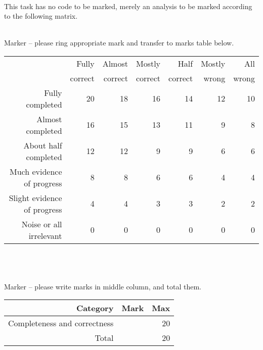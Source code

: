 \parbox{\textwidth}{
 \\

This task has no code to be marked, merely an analysis to be marked according
to the following matrix.

 \\
Marker -- please ring appropriate mark and transfer to marks table below. \\

\begin{tabular}{||r||r|r|r|r|r|r||} \hline \hline
                            & Fully   & Almost  & Mostly  & Half    & Mostly & All   \\
                            & correct & correct & correct & correct & wrong  & wrong \\ \hline
\hline
Fully completed             &      20 &        18 &    16 &      14 &     12 &    10 \\ \hline
Almost completed            &      16 &        15 &    13 &      11 &      9 &     8 \\ \hline
About half completed        &      12 &        12 &     9 &       9 &      6 &     6 \\ \hline
Much evidence of progress   &       8 &         8 &     6 &       6 &      4 &     4 \\ \hline
Slight evidence of progress &       4 &         4 &     3 &       3 &      2 &     2 \\ \hline
Noise or all irrelevant     &       0 &         0 &     0 &       0 &      0 &     0 \\ \hline
\hline 
\end{tabular} \\ \\

 \\
Marker -- please write marks in middle column, and total them. \\


\begin{tabular}{||r|r|r||} \hline \hline
Category                     & Mark & Max \\ \hline
\hline
Completeness and correctness &      & 20 \\ \hline
\hline
Total                        &      & 20 \\ \hline
\hline
\end{tabular} \\ \\

}
